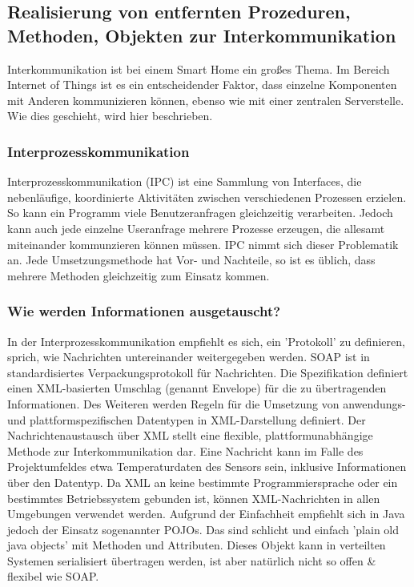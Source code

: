 \documentclass[letterpaper, 12pt]{article}
\let\tempsubsection\subsection
\renewcommand\subsection[1]{\vspace{0cm}\tempsubsection{#1}\vspace{0cm}}
\let\tempsubsubsection\subsubsection
\renewcommand\subsubsection[1]{\vspace{0cm}\tempsubsubsection{#1}\vspace{0cm}}
\begin{document}
\subsection{Realisierung von entfernten Prozeduren, Methoden, Objekten zur Interkommunikation}

Interkommunikation ist bei einem Smart Home ein großes Thema. Im Bereich Internet of Things ist es ein entscheidender Faktor, dass einzelne Komponenten mit Anderen kommunizieren können, ebenso wie mit einer zentralen Serverstelle. Wie dies geschieht, wird hier beschrieben.

\subsubsection{Interprozesskommunikation}

Interprozesskommunikation (IPC) ist eine Sammlung von Interfaces, die nebenläufige, koordinierte Aktivitäten zwischen verschiedenen Prozessen erzielen. So kann ein Programm viele Benutzeranfragen gleichzeitig verarbeiten. Jedoch kann auch jede einzelne Useranfrage mehrere Prozesse erzeugen, die allesamt miteinander kommunzieren können müssen. IPC nimmt sich dieser Problematik an. Jede Umsetzungsmethode hat Vor- und Nachteile, so ist es üblich, dass mehrere Methoden gleichzeitig zum Einsatz kommen. \cite{ipc}

\subsubsection{Wie werden Informationen ausgetauscht?}

In der Interprozesskommunikation empfiehlt es sich, ein 'Protokoll' zu definieren, sprich, wie Nachrichten untereinander weitergegeben werden. SOAP ist in standardisiertes Verpackungsprotokoll für Nachrichten. Die Spezifikation definiert einen XML-basierten Umschlag (genannt Envelope) für die zu übertragenden Informationen. Des Weiteren werden Regeln für die Umsetzung von anwendungs- und plattformspezifischen Datentypen in XML-Darstellung definiert. Der Nachrichtenaustausch über XML stellt eine flexible, plattformunabhängige Methode zur Interkommunikation dar. Eine Nachricht kann im Falle des Projektumfeldes etwa Temperaturdaten des Sensors sein, inklusive Informationen über den Datentyp. Da XML an keine bestimmte Programmiersprache oder ein bestimmtes Betriebssystem gebunden ist, können XML-Nachrichten in allen Umgebungen verwendet werden. Aufgrund der Einfachheit empfiehlt sich in Java jedoch der Einsatz sogenannter POJOs. Das sind schlicht und einfach 'plain old java objects' mit Methoden und Attributen. Dieses Objekt kann in verteilten Systemen serialisiert übertragen werden, ist aber natürlich nicht so offen \& flexibel wie SOAP. \cite{ausarbeitungsoa}
\end{document}
